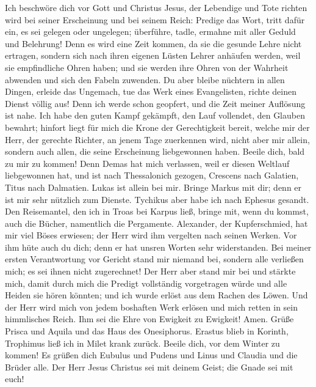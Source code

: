  Ich beschwöre dich vor Gott und Christus Jesus, der
Lebendige und Tote richten wird bei seiner Erscheinung und bei seinem
Reich:  Predige das Wort, tritt dafür ein, es sei gelegen
oder ungelegen; überführe, tadle, ermahne mit aller Geduld und
Belehrung!  Denn es wird eine Zeit kommen, da sie die
gesunde Lehre nicht ertragen, sondern sich nach ihren eigenen Lüsten
Lehrer anhäufen werden, weil sie empfindliche Ohren haben;
 und sie werden ihre Ohren von der Wahrheit abwenden und
sich den Fabeln zuwenden.  Du aber bleibe nüchtern in
allen Dingen, erleide das Ungemach, tue das Werk eines Evangelisten,
richte deinen Dienst völlig aus!  Denn ich werde schon
geopfert, und die Zeit meiner Auflösung ist nahe.  Ich
habe den guten Kampf gekämpft, den Lauf vollendet, den Glauben bewahrt;
 hinfort liegt für mich die Krone der Gerechtigkeit
bereit, welche mir der Herr, der gerechte Richter, an jenem Tage
zuerkennen wird, nicht aber mir allein, sondern auch allen, die seine
Erscheinung liebgewonnen haben.  Beeile dich, bald zu mir
zu kommen!  Denn Demas hat mich verlassen, weil er diesen
Weltlauf liebgewonnen hat, und ist nach Thessalonich gezogen, Crescens
nach Galatien, Titus nach Dalmatien.  Lukas ist allein
bei mir. Bringe Markus mit dir; denn er ist mir sehr nützlich zum
Dienste.  Tychikus aber habe ich nach Ephesus gesandt.
 Den Reisemantel, den ich in Troas bei Karpus ließ,
bringe mit, wenn du kommst, auch die Bücher, namentlich die Pergamente.
 Alexander, der Kupferschmied, hat mir viel Böses
erwiesen; der Herr wird ihm vergelten nach seinen Werken.
 Vor ihm hüte auch du dich; denn er hat unsren Worten
sehr widerstanden.  Bei meiner ersten Verantwortung vor
Gericht stand mir niemand bei, sondern alle verließen mich; es sei ihnen
nicht zugerechnet!  Der Herr aber stand mir bei und
stärkte mich, damit durch mich die Predigt vollständig vorgetragen würde
und alle Heiden sie hören könnten; und ich wurde erlöst aus dem Rachen
des Löwen.  Und der Herr wird mich von jedem boshaften
Werk erlösen und mich retten in sein himmlisches Reich. Ihm sei die Ehre
von Ewigkeit zu Ewigkeit! Amen.  Grüße Prisca und Aquila
und das Haus des Onesiphorus.  Erastus blieb in Korinth,
Trophimus ließ ich in Milet krank zurück.  Beeile dich,
vor dem Winter zu kommen! Es grüßen dich Eubulus und Pudens und Linus
und Claudia und die Brüder alle.  Der Herr Jesus Christus
sei mit deinem Geist; die Gnade sei mit euch!
